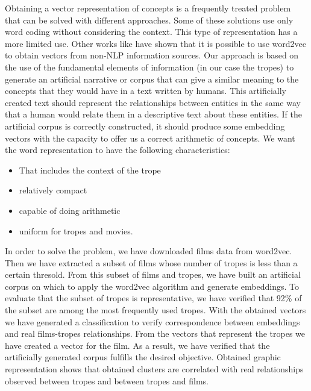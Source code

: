 \documentclass[letterpaper]{article}
\begin{document}
	
	Obtaining a vector representation of concepts is a frequently treated problem that can be solved with different approaches. Some of these solutions use only word coding without considering the context. This type of representation has a more limited use. Other works like \cite{kazama2018} have shown that it is
	possible to use word2vec to obtain vectors from non-NLP information
	sources. Our approach is based on the use of the fundamental elements
	of information (in our case the tropes) to generate an artificial
	narrative or corpus that can give a similar meaning to the concepts
	that they would have in a text written by humans. This artificially
	created text should represent the relationships between entities in
	the same way that a human would relate them in a descriptive text
	about these entities. If the artificial corpus is correctly
	constructed, it should produce some embedding vectors with the
	capacity to offer us a correct arithmetic of concepts. We want the word representation to have the following characteristics: 
	
	\begin{itemize}

	\item That includes the context of the trope
	\item relatively compact
	\item capable of doing arithmetic
	\item uniform for tropes and movies.
		
    \end{itemize}
	   
	   

    In order to solve the problem, we have downloaded films data from word2vec. Then we have extracted a subset of films whose number of tropes is less than a certain thresold. From this subset of films and tropes, we have built an artificial corpus on which to apply the word2vec algorithm and generate embeddings. To evaluate that the subset of tropes is representative, we have verified that 92\% of the subset are among the most frequently used tropes. With the obtained vectors we have generated a classification to verify correspondence between embeddings and real films-tropes relationships. From the vectors that represent the tropes we have created a vector for the film. As a result, we have verified that the artificially generated corpus fulfills the desired objective. Obtained graphic representation shows that obtained clusters are correlated with real relationships observed between tropes and between tropes and films.\\
 
\end{document}
